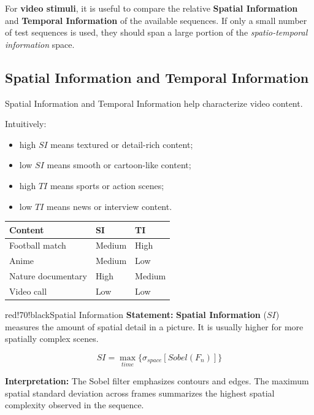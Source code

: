 For \textbf{video stimuli}, it is useful to compare the relative \textbf{Spatial Information} and \textbf{Temporal Information} of the available sequences. If only a small number of test sequences is used, they should span a large portion of the \textit{spatio-temporal information} space.

\subsection{Spatial Information and Temporal Information}

Spatial Information and Temporal Information help characterize video content.

Intuitively:

\begin{itemize}
\item high $SI$ means textured or detail-rich content;
\item low $SI$ means smooth or cartoon-like content;
\item high $TI$ means sports or action scenes;
\item low $TI$ means news or interview content.
\end{itemize}

\begin{center}
\begin{tabular}{|l|l|l|}
\hline
\textbf{Content} & \textbf{SI} & \textbf{TI} \\ \hline
Football match & Medium & High \\ \hline
Anime & Medium & Low \\ \hline
Nature documentary & High & Medium \\ \hline
Video call & Low & Low \\ \hline
\end{tabular}
\end{center}

\begin{calloutbox}{red!70!black}{Spatial Information}
\textbf{Statement:} \textbf{Spatial Information} ($SI$) measures the amount of spatial detail in a picture. It is usually higher for more spatially complex scenes.

\[
SI = \max_{time}\{\sigma_{space}[Sobel(F_n)]\}
\]

\textbf{Interpretation:} The Sobel filter emphasizes contours and edges. The maximum spatial standard deviation across frames summarizes the highest spatial complexity observed in the sequence.
\end{calloutbox}

